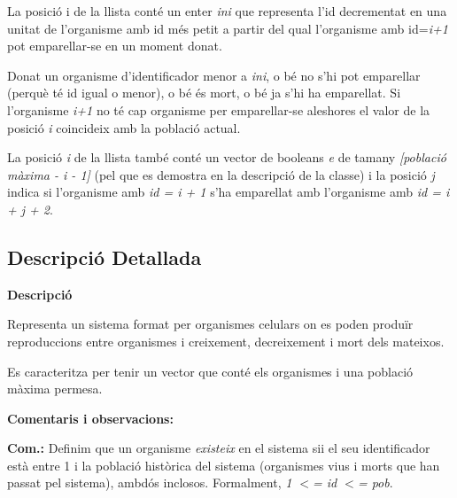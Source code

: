 \begin{DoxyCompactItemize}
\begin{DoxyCompactList}
 La posició i de la llista conté un enter {\itshape ini} que representa l'id decrementat en una unitat de l'organisme amb id més petit a partir del qual l'organisme amb id={\itshape i+1} pot emparellar-\/se en un moment donat. \par
Donat un organisme d'identificador menor a {\itshape ini}, o bé no s'hi pot emparellar (perquè té id igual o menor), o bé és mort, o bé ja s'hi ha emparellat. Si l'organisme {\itshape i+1} no té cap organisme per emparellar-\/se aleshores el valor de la posició {\itshape i} coincideix amb la població actual. \par
La posició {\itshape i} de la llista també conté un vector de booleans {\itshape e} de tamany {\itshape \mbox{[}població màxima -\/ i -\/ 1\mbox{]}} (pel que es demostra en la descripció de la classe) i la posició {\itshape j} indica si l'organisme amb {\itshape id = i + 1} s'ha emparellat amb l'organisme amb {\itshape id = i + j + 2}. \end{DoxyCompactList}\end{DoxyCompactItemize}


\subsection{Descripció Detallada}
{\bfseries Descripció} 

Representa un sistema format per organismes celulars on es poden produïr reproduccions entre organismes i creixement, decreixement i mort dels mateixos.

Es caracteritza per tenir un vector que conté els organismes i una població màxima permesa.

{\bfseries Comentaris i observacions\-:}

{\bfseries Com.\-:} Definim que un organisme {\itshape existeix} en el sistema sii el seu identificador està entre 1 i la població històrica del sistema (organismes vius i morts que han passat pel sistema), ambdós inclosos. Formalment, {\itshape 1 $<$= id $<$= pob}.

